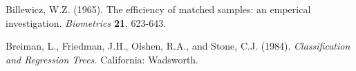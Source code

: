 
\begin{description}

\item Billewicz, W.Z. (1965).  The efficiency of matched samples:
an emperical investigation.  {\em Biometrics} {\bf 21}, 623-643.

\item
Breiman, L., Friedman, J.H., Olshen, R.A., and Stone, C.J. (1984).
{\em Classification and Regression Trees.}
California:  Wadsworth.


\end{description}


